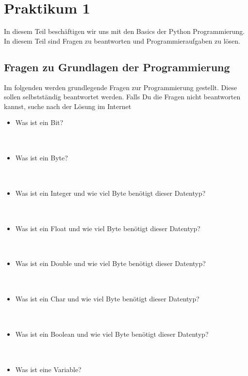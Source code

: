 \chapter{Praktikum 1}
In diesem Teil beschäftigen wir uns mit den Basics der Python Programmierung. In diesem Teil sind Fragen zu beantworten und Programmieraufgaben zu lösen. 

\section{Fragen zu Grundlagen der Programmierung}
Im folgenden werden grundlegende Fragen zur Programmierung gestellt. Diese sollen selbstständig beantwortet werden. Falls Du die Fragen nicht beantworten kannst, suche nach der Lösung im Internet
\begin{itemize}
	\item{Was ist ein Bit?}
	\\
	\\
	\\
	\item{Was ist ein Byte?}
	\\
	\\
	\\
	\item{Was ist ein Integer und wie viel Byte benötigt dieser Datentyp?}
	\\
	\\
	\\
	\item{Was ist ein Float und wie viel Byte benötigt dieser Datentyp?}
	\\
	\\
	\\
	\item{Was ist ein Double und wie viel Byte benötigt dieser Datentyp?}
	\\
	\\
	\\
	\item{Was ist ein Char und wie viel Byte benötigt dieser Datentyp?}
	\\
	\\
	\\
	\item{Was ist ein Boolean und wie viel Byte benötigt dieser Datentyp?}
	\\
	\\
	\\
	\item{Was ist eine Variable?}
	\\
	\\

\end{itemize}
